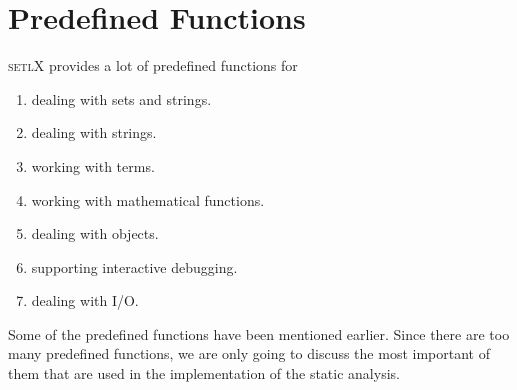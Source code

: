 \documentclass[11pt]{report}
\begin{document}
\section{Predefined Functions}

\textsc{setlX} provides a lot of predefined functions for
\begin{enumerate}
\item dealing with sets and strings.
\item dealing with strings.
\item working with terms.
\item working with mathematical functions.
\item dealing with objects.
\item supporting interactive debugging.
\item dealing with I/O.
\end{enumerate}

Some of the predefined functions have been mentioned earlier. Since there are too many predefined functions, we are only going to discuss the most important of them that are used in the implementation of the static analysis.
\end{document}
